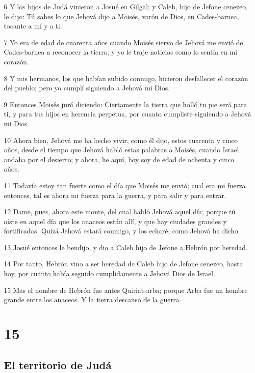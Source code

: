 \par 6 Y los hijos de Judá vinieron a Josué en Gilgal; y Caleb, hijo de Jefone cenezeo, le dijo: Tú sabes lo que Jehová dijo a Moisés, varón de Dios, en Cades-barnea, tocante a mí y a ti. 
\par 7 Yo era de edad de cuarenta años cuando Moisés siervo de Jehová me envió de Cades-barnea a reconocer la tierra; y yo le traje noticias como lo sentía en mi corazón. 
\par 8 Y mis hermanos, los que habían subido conmigo, hicieron desfallecer el corazón del pueblo; pero yo cumplí siguiendo a Jehová mi Dios.
\par 9 Entonces Moisés juró diciendo: Ciertamente la tierra que holló tu pie será para ti, y para tus hijos en herencia perpetua, por cuanto cumpliste siguiendo a Jehová mi Dios. 
\par 10 Ahora bien, Jehová me ha hecho vivir, como él dijo, estos cuarenta y cinco años, desde el tiempo que Jehová habló estas palabras a Moisés, cuando Israel andaba por el desierto; y ahora, he aquí, hoy soy de edad de ochenta y cinco años.
\par 11 Todavía estoy tan fuerte como el día que Moisés me envió; cual era mi fuerza entonces, tal es ahora mi fuerza para la guerra, y para salir y para entrar.
\par 12 Dame, pues, ahora este monte, del cual habló Jehová aquel día; porque tú oíste en aquel día que los anaceos están allí, y que hay ciudades grandes y fortificadas. Quizá Jehová estará conmigo, y los echaré, como Jehová ha dicho.
\par 13 Josué entonces le bendijo, y dio a Caleb hijo de Jefone a Hebrón por heredad.
\par 14 Por tanto, Hebrón vino a ser heredad de Caleb hijo de Jefone cenezeo, hasta hoy, por cuanto había seguido cumplidamente a Jehová Dios de Israel.
\par 15 Mas el nombre de Hebrón fue antes Quiriat-arba; porque Arba fue un hombre grande entre los anaceos. Y la tierra descansó de la guerra.

\chapter{15}

\section*{El territorio de Judá}

